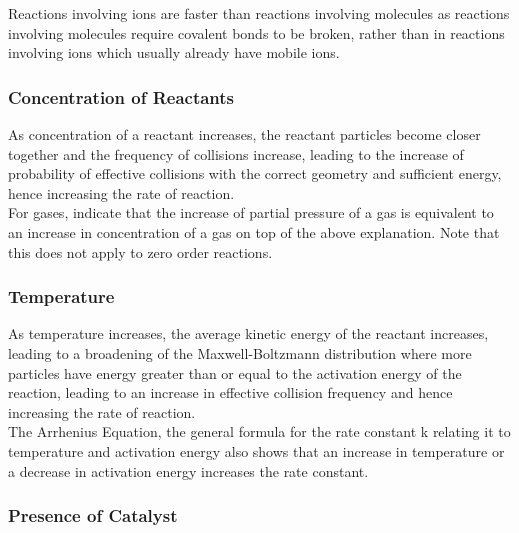 \documentclass[../main]{subfiles}
\begin{document}
	Reactions involving ions are faster than reactions involving molecules as reactions involving molecules require covalent bonds to be broken, rather than in reactions involving ions which usually already have mobile ions.

	\subsubsection{Concentration of Reactants}

	As concentration of a reactant increases, the reactant particles become closer together and the frequency of collisions increase, leading to the increase of probability of effective collisions with the correct geometry and sufficient energy, hence increasing the rate of reaction. \\

	For gases, indicate that the increase of partial pressure of a gas is equivalent to an increase in concentration of a gas on top of the above explanation. Note that this does not apply to zero order reactions.

	\subsubsection{Temperature}

	As temperature increases, the average kinetic energy of the reactant increases, leading to a broadening of the Maxwell-Boltzmann distribution where more particles have energy greater than or equal to the activation energy of the reaction, leading to an increase in effective collision frequency and hence increasing the rate of reaction. \\

	The Arrhenius Equation, the general formula for the rate constant k relating it to temperature and activation energy also shows that an increase in temperature or a decrease in activation energy increases the rate constant.


	\subsubsection{Presence of Catalyst}

\end{document}
